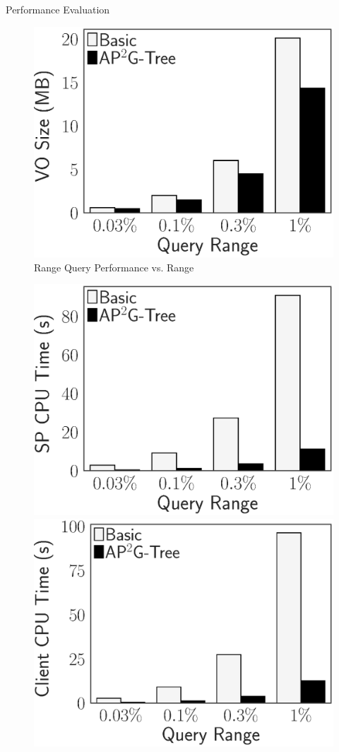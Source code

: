 \documentclass[xcolor={dvipsnames},aspectratio=169,10pt]{beamer}
\begin{document}
\begin{frame}{Performance Evaluation}
\begin{figure}
    \includegraphics[height=\ht\figbox]{exp-figs/access-control/range_vo.eps}
    \caption{Range Query Performance vs. Range}
  \end{figure}
  \begin{figure}
    \centering
    \includegraphics[height=\ht\figbox]{exp-figs/access-control/join_sp.eps}\quad%
    \includegraphics[height=\ht\figbox]{exp-figs/access-control/join_user.eps}\quad%

\end{figure}
\end{frame}
\end{document}

